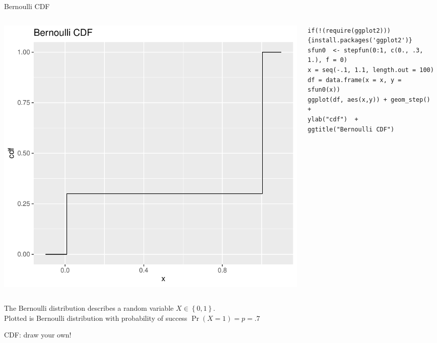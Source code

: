 \documentclass[aspectratio=169,11pt]{beamer}
\begin{document}
\begin{frame}[fragile]{Bernoulli CDF}
\begin{columns}
\begin{column}{0.5\textwidth}
\begin{center}
\includegraphics[height=.5\textheight]{bernoulli-cdf} 
\end{center}
\end{column}
\begin{column}{0.5\textwidth} 
\begin{lstlisting}
if(!(require(ggplot2))){install.packages('ggplot2')}
sfun0  <- stepfun(0:1, c(0., .3, 1.), f = 0)  
x = seq(-.1, 1.1, length.out = 100)
df = data.frame(x = x, y = sfun0(x))
ggplot(df, aes(x,y)) + geom_step() +
ylab("cdf")  +
ggtitle("Bernoulli CDF")
\end{lstlisting}
\end{column}
\end{columns}
The Bernoulli distribution describes a random variable $X\in \left\{0,1\right\}$. \\
Plotted is Bernoulli distribution with probability of success $\Pr(X=1)=p=.7$

\end{frame}





\begin{frame}{CDF: draw your own!}
\end{frame}
\end{document}
